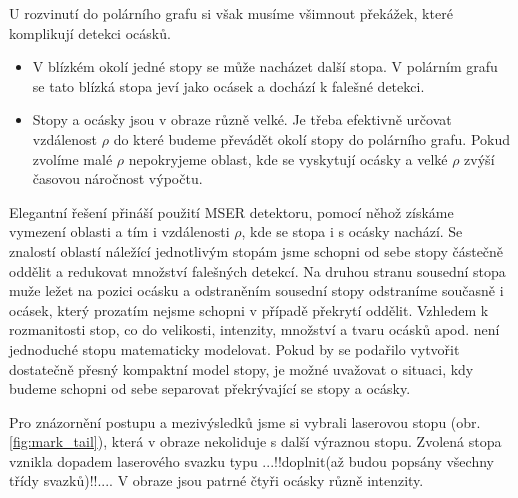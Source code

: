 	 U rozvinutí do polárního grafu si však musíme všimnout překážek, které komplikují detekci ocásků.  
	 \begin{itemize}	 	
	 	\item V blízkém okolí jedné stopy se může nacházet další stopa. V polárním grafu se tato blízká stopa jeví jako ocásek a dochází k falešné detekci.	
	 	\item Stopy a ocásky jsou v obraze různě velké. Je třeba efektivně určovat vzdálenost $\rho$ do které budeme převádět okolí stopy do polárního grafu. Pokud zvolíme malé $\rho$ nepokryjeme oblast, kde se vyskytují ocásky a velké $\rho$ zvýší časovou náročnost výpočtu.   	
	\end{itemize}
	
	Elegantní řešení přináší použití MSER detektoru, pomocí něhož získáme vymezení oblasti a tím i vzdálenosti $\rho$, kde se stopa i s ocásky nachází. Se znalostí oblastí náležící jednotlivým stopám jsme schopni od sebe stopy částečně oddělit a redukovat množství falešných detekcí. Na druhou stranu sousední stopa muže ležet na pozici ocásku a odstraněním sousední stopy odstraníme současně i ocásek, který prozatím nejsme schopni v případě překrytí oddělit. Vzhledem k rozmanitosti stop, co do velikosti, intenzity, množství a tvaru ocásků apod. není jednoduché stopu matematicky modelovat. Pokud by se podařilo vytvořit dostatečně přesný kompaktní model stopy, je možné uvažovat o situaci, kdy budeme schopni od sebe separovat překrývající se stopy a ocásky. 
	
 Pro znázornění postupu a mezivýsledků jsme si vybrali laserovou stopu (obr.\ref{fig:mark_tail}), která v obraze nekoliduje s další výraznou stopu. Zvolená stopa vznikla dopadem laserového svazku typu ...!!doplnit(až budou popsány všechny třídy svazků)!!.... V obraze jsou patrné čtyři ocásky různě intenzity. 
	

